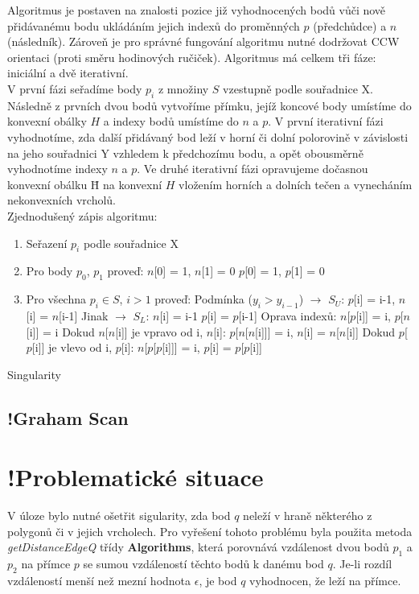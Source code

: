 \documentclass[a4paper, 12pt]{article}
\begin{document}
Algoritmus je postaven na znalosti pozice již vyhodnocených bodů vůči nově přidá\-vanému bodu ukládáním jejich indexů do proměnných $p$ (předchůdce) a $n$ (následník). Zároveň je pro správné fungování algoritmu nutné dodržovat CCW orientaci (proti směru hodinových ručiček). Algoritmus má celkem tři fáze: iniciální a dvě iterativní.\\

V první fázi seřadíme body $p_i$ z množiny $S$ vzestupně podle souřadnice X. Následně z prvních dvou bodů vytvoříme přímku, jejíž koncové body umístíme do konvexní obálky $H$ a indexy bodů umístíme do $n$ a $p$. V první iterativní fázi vyhodnotíme, zda další přidávaný bod leží v horní či dolní polorovině v závislosti na jeho souřadnici Y vzhledem k předchozímu bodu, a opět obousměrně vyhodnotíme indexy $n$ a $p$. Ve druhé iterativní fázi opravujeme dočasnou konvexní obálku \={H} na konvexní $H$ vložením horních a dolních tečen a vynecháním nekonvexních vrcholů.\\

Zjednodušený zápis algoritmu: 
\begin{enumerate}
\item Seřazení $p_i$ podle souřadnice X
\item Pro body $p_0$, $p_1$ proveď:
\subitem $n$[0] = 1, $n$[1] = 0
\subitem $p$[0] = 1, $p$[1] = 0
\item Pro všechna $p_i \in S$, $i > 1$ proveď:
\subitem Podmínka ($y_i > y_{i-1}$) $\rightarrow$ $S_U$: $p$[i] = i-1, $n$[i] = $n$[i-1]
\subitem Jinak $\rightarrow$ $S_L$: $n$[i] = i-1 $p$[i] = $p$[i-1]
\subitem Oprava indexů: $n$[$p$[i]] = i, $p$[$n$[i]] = i
\subitem Dokud $n$[$n$[i]] je vpravo od i, $n$[i]:
\subsubitem $p$[$n$[$n$[i]]] = i, $n$[i] = $n$[$n$[i]]
\subitem Dokud $p$[$p$[i]] je vlevo od i, $p$[i]:
\subsubitem $n$[$p$[$p$[i]]] = i, $p$[i] = $p$[$p$[i]]
\end{enumerate}

Singularity

\subsection{!Graham Scan}

\section{!Problematické situace}
V úloze bylo nutné ošetřit sigularity, zda bod $q$ neleží v hraně některého z polygonů či v jejich vrcholech. Pro vyřešení tohoto problému byla použita metoda \textit{getDistanceEdgeQ} třídy \textbf{Algorithms}, která porovnává vzdálenost dvou bodů $p_1$ a $p_2$ na přímce $p$ se sumou vzdáleností těchto bodů k danému bod $q$. Je-li rozdíl vzdáleností menší než mezní hodnota $\epsilon$, je bod $q$ vyhodnocen, že leží na přímce.\\
\end{document}
